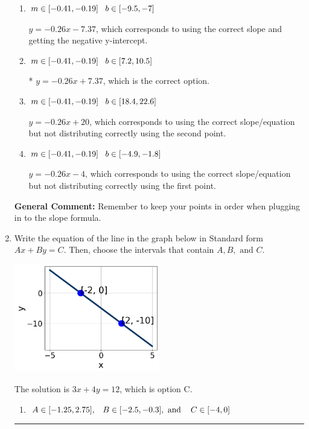 \documentclass{extbook}[14pt]
\newcommand{\litem}[1]{\item #1

\rule{\textwidth}{0.4pt}}
\begin{document}
\begin{enumerate}
{\begin{enumerate}[label=\Alph*.]
 $y = 0.26x + 12.63$, which corresponds to using the negative slope and the correct equation.
\item \( m \in [-0.41, -0.19] \hspace*{3mm} b \in [-9.5, -7] \)

 $y = -0.26x -7.37$, which corresponds to using the correct slope and getting the negative y-intercept.
\item \( m \in [-0.41, -0.19] \hspace*{3mm} b \in [7.2, 10.5] \)

* $y = -0.26x + 7.37$, which is the correct option.
\item \( m \in [-0.41, -0.19] \hspace*{3mm} b \in [18.4, 22.6] \)

 $y = -0.26x + 20$, which corresponds to using the correct slope/equation but not distributing correctly using the second point.
\item \( m \in [-0.41, -0.19] \hspace*{3mm} b \in [-4.9, -1.8] \)

 $y = -0.26x -4$, which corresponds to using the correct slope/equation but not distributing correctly using the first point.
\end{enumerate}

\textbf{General Comment:} Remember to keep your points in order when plugging in to the slope formula.
}
\litem{
Write the equation of the line in the graph below in Standard form $Ax+By=C$. Then, choose the intervals that contain $A, B, \text{ and } C$.

\begin{center}
    \includegraphics[width=0.5\textwidth]{../Figures/linearGraphToStandardC.png}
\end{center}


The solution is \( 3x + 4y = 12 \), which is option C.\begin{enumerate}[label=\Alph*.]
\item \( A \in [-1.25, 2.75], \hspace{3mm} B \in [-2.5, -0.3], \text{ and } \hspace{3mm} C \in [-4, 0] \)


\end{enumerate}}
\end{enumerate}
\end{document}
